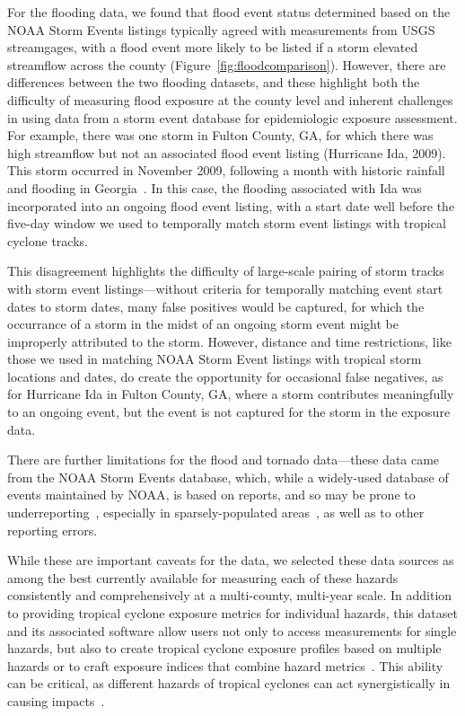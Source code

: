 For the flooding data, we found that flood event status determined based on the
NOAA Storm Events listings typically agreed with measurements from \ac{USGS}
streamgages, with a flood event more likely to be listed if a storm elevated
streamflow across the county (Figure~\ref{fig:floodcomparison}).  However,
there are differences between the two flooding datasets, and these highlight
both the difficulty of measuring flood exposure at the county level and
inherent challenges in using data from a storm event database for epidemiologic
exposure assessment.  For example, there was one storm in Fulton County, GA,
for which there was high streamflow but not an associated flood event listing
(Hurricane Ida, 2009).  This storm occurred in November 2009, following a month
with historic rainfall and flooding in
Georgia~\parencite{shepherd2011overview}.  In this case, the flooding
associated with Ida was incorporated into an ongoing flood event listing, with
a start date well before the five-day window we used to temporally match storm
event listings with tropical cyclone tracks. 

This disagreement highlights the difficulty of large-scale pairing of storm
tracks with storm event listings---without criteria for temporally matching
event start dates to storm dates, many false positives would be
captured, for which the occurrance of a storm in the midst of an ongoing storm
event might be improperly attributed to the storm.  However, distance
and time restrictions, like those we used in matching NOAA Storm Event listings
with tropical storm locations and dates, do create the opportunity for
occasional false negatives, as for Hurricane Ida in Fulton County, GA, where a
storm contributes meaningfully to an ongoing event, but the event is not
captured for the storm in the exposure data.  

There are further limitations for the flood and tornado data---these data came
from the \ac{NOAA} Storm Events database, which, while a widely-used database
of events maintained by \ac{NOAA}, is based on reports, and so may be prone to
underreporting~\parencite{Ashley2008flood, Curran2000}, especially in
sparsely-populated areas~\parencite{Witt1998, Ashley2007}, as well as to other
reporting errors. 

While these are important caveats for the data, we selected these data sources
as among the best currently available for measuring each of these hazards
consistently and comprehensively at a multi-county, multi-year scale. In
addition to providing tropical cyclone exposure metrics for individual hazards,
this dataset and its associated software allow users not only to access
measurements for single hazards, but also to create tropical cyclone exposure
profiles based on multiple hazards or to craft exposure indices that combine
hazard metrics~\parencite{chakraborty2005population, peduzzi2009assessing}.
This ability can be critical, as different hazards of tropical cyclones can
act synergistically in causing impacts~\parencite{smith2009}.  


